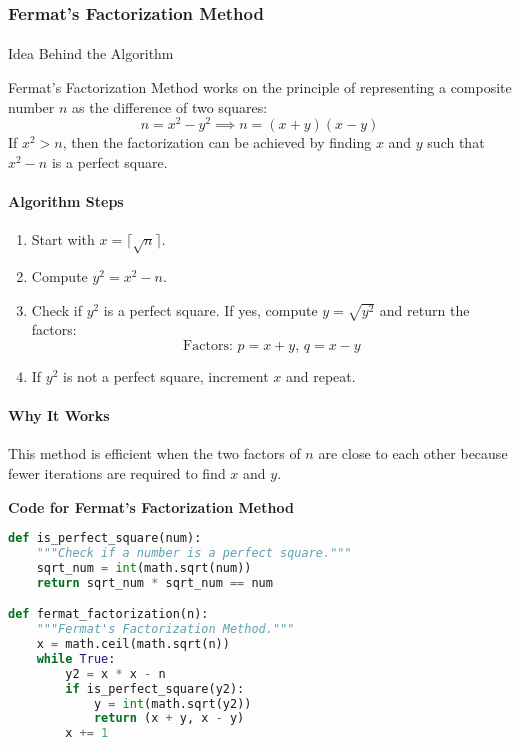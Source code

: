 \documentclass[12pt]{report}
\begin{document}
\subsubsection{Fermat’s Factorization Method}
\paragraph{}{Idea Behind the Algorithm}  

Fermat's Factorization Method works on the principle of representing a composite number $n$ as the difference of two squares:
\[
n = x^2 - y^2 \implies n = (x + y)(x - y)
\]
If $x^2 > n$, then the factorization can be achieved by finding $x$ and $y$ such that $x^2 - n$ is a perfect square.

\paragraph{Algorithm Steps}
\begin{enumerate}
    \item Start with $x = \lceil \sqrt{n} \rceil$.
    \item Compute $y^2 = x^2 - n$.
    \item Check if $y^2$ is a perfect square. If yes, compute $y = \sqrt{y^2}$ and return the factors:
\[
    \text{Factors: } p = x + y, \, q = x - y
\]
    \item If $y^2$ is not a perfect square, increment $x$ and repeat.
\end{enumerate}

\paragraph{Why It Works}

This method is efficient when the two factors of $n$ are close to each other because fewer iterations are required to find $x$ and $y$.
\begin{center}
    \textbf{Code for Fermat’s Factorization Method}
\end{center}
\begin{lstlisting}[language=Python]
def is_perfect_square(num):
    """Check if a number is a perfect square."""
    sqrt_num = int(math.sqrt(num))
    return sqrt_num * sqrt_num == num

def fermat_factorization(n):
    """Fermat's Factorization Method."""
    x = math.ceil(math.sqrt(n))
    while True:
        y2 = x * x - n
        if is_perfect_square(y2):
            y = int(math.sqrt(y2))
            return (x + y, x - y)
        x += 1
\end{lstlisting}
\end{document}
